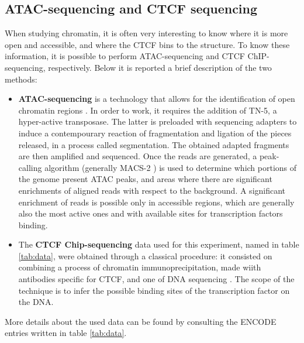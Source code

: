 \subsection{ATAC-sequencing and CTCF sequencing}
When studying chromatin, it is often very interesting to know where it is more open and accessible, and where the CTCF bins to the structure. To know these information, it is possible to perform ATAC-sequencing and CTCF ChIP-sequencing, respectively. Below it is reported a brief description of the two methods:

\begin{itemize}
  \item \textbf{ATAC-sequencing} is a technology that allows for the identification of open chromatin regions 
  \cite{buenrostroTranspositionNativeChromatin2013a, grandiChromatinAccessibilityProfiling2022}. 
  In order to work, it requires the addition of TN-5, a hyper-active transposase. The latter is preloaded with sequencing adapters
  \cite{grandiChromatinAccessibilityProfiling2022}
  to induce a contempourary reaction of fragmentation and ligation of the pieces released, in a process called segmentation. The obtained adapted fragments are then amplified and sequenced. Once the reads are generated, a peak-calling algorithm (generally MACS-2 
  \cite{zhangModelbasedAnalysisChIPSeq2008a}) 
  is used to determine which portions of the genome present ATAC peaks, and areas where there are significant enrichments of aligned reads with respect to the background. A significant enrichment of reads is possible only in accessible regions, which are generally also the most active ones and with available sites for transcription factors binding.
  \item The \textbf{CTCF Chip-sequencing} data used for this experiment, named in table \ref{tab:data}, were obtained through a classical procedure: it consisted on combining a process of chromatin immunoprecipitation, made wiith antibodies specific for CTCF, and one of DNA sequencing
  \cite{shahChromatinImmunoprecipitationSequencing2009}. 
  The scope of the technique is to infer the possible binding sites of the transcription factor on the DNA.
  
\end{itemize}

\noindent More details about the used data can be found by consulting the ENCODE
\cite{encodeprojectconsortiumIntegratedEncyclopediaDNA2012}
 entries written in table \ref{tab:data}.


